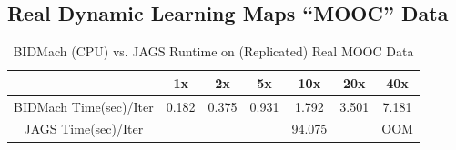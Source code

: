 \documentclass{article} %
\begin{document}
\subsection{Real Dynamic Learning Maps ``MOOC'' Data}\label{ssec:mooc_data}

%
%
% 
%
%
%
\begin{table}[t]
\caption{BIDMach (CPU) vs. JAGS Runtime on (Replicated) Real MOOC Data}
\label{tab:bidmach_jags_realmooc}
\begin{center}
\begin{tabular}{ |c|c|c|c|c|c|c| } 
\hline
                  & 1x    & 2x    & 5x    & 10x   & 20x   & 40x   \\
\hline \hline
BIDMach Time(sec)/Iter & 0.182 & 0.375 & 0.931 & 1.792 & 3.501 & 7.181 \\ 
JAGS Time(sec)/Iter    & & & & 94.075 & & OOM \\
\hline
\end{tabular}
\end{center}
\end{table}
\end{document}

